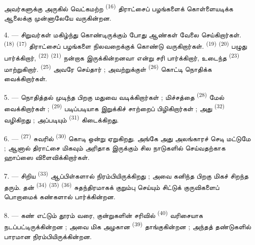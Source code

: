 அவர்களுக்கு அருகில் வெட்கமற்ற 
\textsuperscript{(16)} திராட்சைப் பழங்களைக் கொள்ளையடிக்க ஆலைக்கு
முன்னாலேயே வருகின்றன.

4. --- சிறுவர்கள் மகிழ்ந்து கொண்டிருக்கும் போது ஆண்கள் வேலை
செய்கிறார்கள்.  \textsuperscript{(18)}
 \textsuperscript{(17)} திராட்சைப் பழங்களை
நிலவறைக்குக் கொண்டு வருகிறார்கள். 
\textsuperscript{(19)}  \textsuperscript{(20)}
பழுது பார்க்கிறார்,  \textsuperscript{(22)}
 \textsuperscript{(21)} நன்றாக இருக்கின்றனவா
என்று சரி பார்க்கிறார், உடைந்த 
\textsuperscript{(23)} மாற்றுகிறார். 
\textsuperscript{(25)} அவரே செய்தார் ; அவற்றுக்குள்  \textsuperscript{(26)} கொட்டி நொதிக்க வைக்கிறார்கள்.

5. --- நொதித்தல் முடிந்த பிறகு மதுவை வடிக்கிறார்கள் ; மிச்சத்தை
 \textsuperscript{(28)} மேல் வைக்கிறார்கள் ;
 \textsuperscript{(29)} படிப்படியாக இறுக்கிச்
சாற்றைப் பிழிகிறார்கள் ; அது 
\textsuperscript{(32)} வழிகிறது ; அப்படியும் 
\textsuperscript{(31)} கிடைக்கிறது.

\VUsaut{6.0mm}
\VUsaut{3.4mm}

6. ---  \textsuperscript{(27)} சுவரில் 
\textsuperscript{(30)} கொடி ஒன்று ஏறுகிறது. அங்கே அது அலங்காரச் செடி
மட்டுமே ; ஆனால் திராட்சை மிகவும் அரிதாக இருக்கும் சில நாடுகளில்
 செய்வதற்காக ஹாப்ஸை விளைவிக்கிறார்கள்.

7. --- சிறிய  \textsuperscript{(33)} ஆப்பிள்களால்
நிரம்பியிருக்கிறது ; அவை கனிந்த பிறகு மிகச் சிறந்த  தரும். தன்  \textsuperscript{(34)}
 \textsuperscript{(35)} 
\textsuperscript{(36)} சுதந்திரமாகக் குறும்பு செய்யும் சிட்டுக்
குருவிகளைப் பொறாமைக் கண்களால் பார்க்கின்றன.

8. --- கண் எட்டும் தூரம் வரை, குன்றுகளின் சரிவில்  \textsuperscript{(40)} வரிசையாக நடப்பட்டிருக்கின்றன ; அவை
மிக அழகான  \textsuperscript{(39)}
தாங்குகின்றன ; அந்தத் தண்டுகளில் பாரமான 
நிரம்பியிருக்கின்றன.

